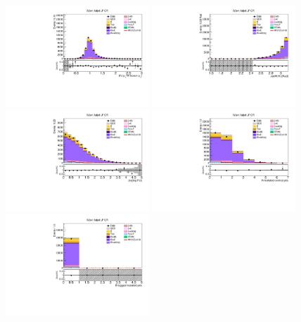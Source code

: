 \begin{figure}[tbp]
  \begin{center}
    \includegraphics[width=0.48\textwidth]{figures/wlnhbb2016/boosted/WenWHLightFlavorFJCR_fj1WPtBalance.pdf}
    \includegraphics[width=0.48\textwidth]{figures/wlnhbb2016/boosted/WenWHLightFlavorFJCR_deltaPhiVH.pdf}
    \includegraphics[width=0.48\textwidth]{figures/wlnhbb2016/boosted/WenWHLightFlavorFJCR_dEtal1fj1.pdf}
    \includegraphics[width=0.48\textwidth]{figures/wlnhbb2016/boosted/WenWHLightFlavorFJCR_nIsojet.pdf}
    \includegraphics[width=0.48\textwidth]{figures/wlnhbb2016/boosted/WenWHLightFlavorFJCR_isojetNBtags.pdf}

\end{center}
\end{figure}
